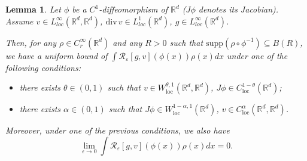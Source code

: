 \documentclass{article}
\newtheorem{lemma}[theorem]{Lemma}
\newcommand{\loc}{\mathrm{loc}}
\begin{document}
 \begin{lemma}
 \label{dim12} Let $\phi$ be a $C^{1}$-diffeomorphism of
 $\mathbb{R}^{d}$ ($J \phi$ denotes its Jacobian). Assume
  $ v    \in L_{loc}^{\infty}\left(
\mathbb{R}^{d},\mathbb{R}^{d}\right) $, ${\mathrm{div}\,}v\in
L_{loc}^{1}\left(  \mathbb{R}^{d}\right)$, $g    \in
L_{loc}^{\infty}\left(  \mathbb{R}^{d}\right)$.

Then, for any $\rho \in C_r^{\infty}(  \mathbb{R}^{d})$ and any
$R>0$ such that $\mathrm{supp}( \rho\circ \phi^{-1}) \subseteq
B(R)$,
 we have a uniform bound of
 $\int\mathcal{R}_{\varepsilon}\left[
g,v\right] \left(  \phi\left(  x\right)  \right)  \rho\left(
x\right)  dx $ under one of the following conditions:
\begin{itemize}
\item[(i)] there exists $\theta   \in (0,1)$ such
that $
  v \in W_{\loc}^{\theta, 1}(
 \mathbb{R}^{d}, \mathbb{R}^{d})$, $ J\phi \in
C_{\loc}^{1 - \theta}( \mathbb{R}^{d}) $;

\item[(ii)] there exists $\alpha  \in (0,1)$ such that
$
  J \phi \in W_{\loc}^{1 - \alpha, 1}(
 \mathbb{R}^{d} ) $, $ v \in
C_{\loc}^{\alpha}( \mathbb{R}^{d}, \mathbb{R}^{d}) $.
\end{itemize}
Moreover, under one of the previous conditions, we also have
\[
\lim_{\varepsilon\rightarrow0}\int\mathcal{R}_{\varepsilon}\left[
g,v\right] \left(  \phi\left(  x\right)  \right)  \rho\left(
x\right)  dx=0.
\]
\end{lemma}
\end{document}
